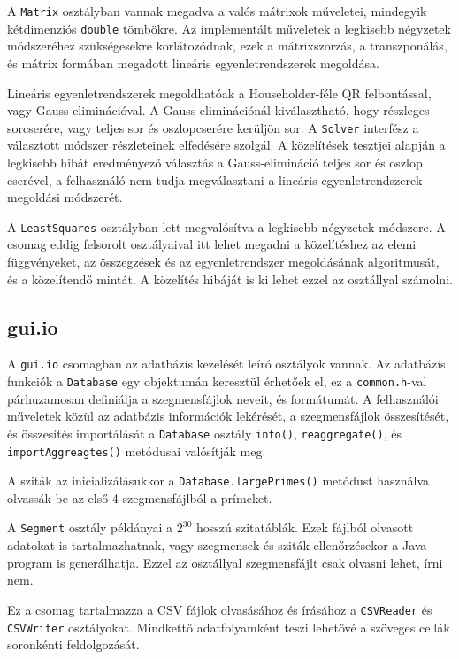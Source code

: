 A \texttt{Matrix} osztályban vannak megadva a valós mátrixok műveletei, mindegyik kétdimenziós \texttt{double} tömbökre.
Az implementált műveletek a legkisebb négyzetek módszeréhez szükségesekre korlátozódnak, ezek a mátrixszorzás, a transzponálás, és mátrix formában megadott lineáris egyenletrendszerek megoldása.

Lineáris egyenletrendszerek megoldhatóak a Householder-féle QR felbontással, vagy Gauss-eliminációval.
A Gauss-eliminációnál kiválasztható, hogy részleges sorcserére, vagy teljes sor és oszlopcserére kerüljön sor.
A \texttt{Solver} interfész a választott módszer részleteinek elfedésére szolgál.
A közelítések tesztjei alapján a legkisebb hibát eredményező választás a Gauss-elimináció teljes sor és oszlop cserével, a felhasználó nem tudja megválasztani a lineáris egyenletrendszerek megoldási módszerét.

A \texttt{LeastSquares} osztályban lett megvalósítva a legkisebb négyzetek módszere.
A csomag eddig felsorolt osztályaival itt lehet megadni a közelítéshez az elemi függvényeket, az összegzések és az egyenletrendszer megoldásának algoritmusát, és a közelítendő mintát.
A közelítés hibáját is ki lehet ezzel az osztállyal számolni.

\subsection{gui.io}

A \texttt{gui.io} csomagban az adatbázis kezelését leíró osztályok vannak.
Az adatbázis funkciók a \texttt{Database} egy objektumán keresztül érhetőek el, ez a \texttt{common.h}-val párhuzamosan definiálja a szegmensfájlok neveit, és formátumát.
A felhasználói műveletek közül az adatbázis információk lekérését, a szegmensfájlok összesítését, és összesítés importálását a \texttt{Database} osztály \texttt{info()}, \texttt{reaggregate()}, és \texttt{importAggreagtes()} metódusai valósítják meg.

A sziták az inicializálásukkor a \texttt{Database.largePrimes()} metódust használva olvassák be az első 4 szegmensfájlból a prímeket.

A \texttt{Segment} osztály példányai a $2^{30}$ hosszú szitatáblák.
Ezek fájlból olvasott adatokat is tartalmazhatnak, vagy szegmensek és sziták ellenőrzésekor a Java program is generálhatja.
Ezzel az osztállyal szegmensfájlt csak olvasni lehet, írni nem.

Ez a csomag tartalmazza a CSV fájlok olvasásához és írásához a \texttt{CSVReader} és \texttt{CSVWriter} osztályokat.
Mindkettő adatfolyamként teszi lehetővé a szöveges cellák soronkénti feldolgozását.

